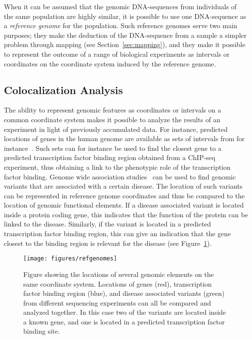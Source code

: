 When it can be assumed that the genomic DNA-sequences from individuals of the same population are highly similar, it is possible to use one DNA-sequence as a \emph{reference genome} for the population.
Such reference genomes serve two main purposes;
they make the deduction of the DNA-sequence from a sample a simpler problem through mapping (see Section~\ref{sec:mapping}), and they make it possible to represent the outcome of a range of biological experiments as intervals or coordinates on the coordinate system induced by the reference genome. 

\subsection{Colocalization Analysis}
The ability to represent genomic features as coordinates or intervals on a common coordinate system makes it possible to analyze the results of an experiment in light of previously accumulated data.
For instance, predicted locations of genes in the human genome are available as sets of intervals from for instance~\cite{genelist}.
Such sets can for instance be used to find the closest gene to a predicted transcription factor binding region obtained from a ChIP-seq experiment, thus obtaining a link to the phenotypic role of the transcription factor binding.
Genome wide association studies~\cite{gwas} can be used to find genomic variants that are associated with a certain disease.
The location of such variants can be represented in reference genome coordinates and thus be compared to the location of genomic functional elements.
If a disease associated variant is located inside a protein coding gene, this indicates that the function of the protein can be linked to the disease.
Similarly, if the variant is located in a predicted transcription factor binding region, this can give an indication that the gene closest to the binding region is relevant for the disease (see Figure~\ref{fig:refpos}).
\begin{figure}
  \centering
  \texttt{[image: figures/refgenomes]}
  \caption{Figure showing the locations of several genomic elements on the same coordinate system.
    Locations of genes (red), transcription factor binding region (blue), and disease associated variants (green) from different sequencing experiments can all be compared and analyzed together.
    In this case two of the variants are located inside a known gene, and one is located in a predicted transcription factor binding site.
  }
  \label{fig:refpos}

\end{figure}

